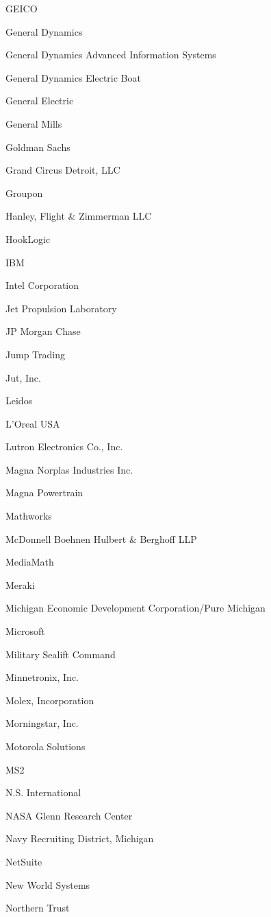 \documentclass[twoside]{article}
\begin{document}
\begin{center}
\begin{multicols}{5}
\begin{FlushLeft}
\begin{compactitem}
\item GEICO
\item General Dynamics
\item General Dynamics Advanced Information Systems
\item General Dynamics Electric Boat
\item General Electric
\item General Mills
\item Goldman Sachs
\item Grand Circus Detroit, LLC
\item Groupon
\item Hanley, Flight \& Zimmerman LLC
\item HookLogic
\item IBM
\item Intel Corporation
\item Jet Propulsion Laboratory
\item JP Morgan Chase
\item Jump Trading
\item Jut, Inc.
\item Leidos
\item L'Oreal USA
\item Lutron Electronics Co., Inc.
\item Magna Norplas Industries Inc.
\item Magna Powertrain
\item Mathworks
\item McDonnell Boehnen Hulbert \& Berghoff LLP
\item MediaMath
\item Meraki
\item Michigan Economic Development Corporation/Pure Michigan
\item Microsoft
\item Military Sealift Command
\item Minnetronix, Inc.
\item Molex, Incorporation
\item Morningstar, Inc.
\item Motorola Solutions
\item MS2
\item N.S. International
\item NASA Glenn Research Center
\item Navy Recruiting District, Michigan
\item NetSuite
\item New World Systems
\item Northern Trust

\end{compactitem}
\end{FlushLeft}
\end{multicols}
\end{center}
\end{document}
